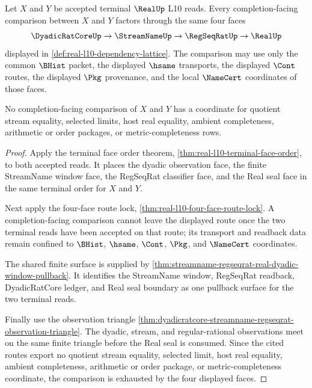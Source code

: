 \begin{theorem}
\label{thm:real-l10-terminal-comparison-exhaustion}
Let $X$ and $Y$ be accepted terminal $\RealUp$ L10 reads. Every
completion-facing comparison between $X$ and $Y$ factors through the same
four faces
$$
\DyadicRatCoreUp \to \StreamNameUp \to \RegSeqRatUp \to \RealUp
$$
displayed in \autoref{def:real-l10-dependency-lattice}. The comparison may
use only the common $\BHist$ packet, the displayed $\hsame$ transports, the
displayed $\Cont$ routes, the displayed $\Pkg$ provenance, and the local
$\NameCert$ coordinates of those faces.

No completion-facing comparison of $X$ and $Y$ has a coordinate for quotient
stream equality, selected limits, host real equality, ambient completeness,
arithmetic or order packages, or metric-completeness rows.
\end{theorem}
\begin{proof}
Apply the terminal face order theorem,
\autoref{thm:real-l10-terminal-face-order}, to both accepted reads. It places
the dyadic observation face, the finite StreamName window face, the RegSeqRat
classifier face, and the Real seal face in the same terminal order for $X$
and $Y$.

Next apply the four-face route lock,
\autoref{thm:real-l10-four-face-route-lock}. A completion-facing comparison
cannot leave the displayed route once the two terminal reads have been
accepted on that route; its transport and readback data remain confined to
$\BHist$, $\hsame$, $\Cont$, $\Pkg$, and $\NameCert$ coordinates.

The shared finite surface is supplied by
\autoref{thm:streamname-regseqrat-real-dyadic-window-pullback}. It identifies
the StreamName window, RegSeqRat readback, DyadicRatCore ledger, and Real
seal boundary as one pullback surface for the two terminal reads.

Finally use the observation triangle
\autoref{thm:dyadicratcore-streamname-regseqrat-observation-triangle}. The
dyadic, stream, and regular-rational observations meet on the same finite
triangle before the Real seal is consumed. Since the cited routes export no
quotient stream equality, selected limit, host real equality, ambient
completeness, arithmetic or order package, or metric-completeness coordinate,
the comparison is exhausted by the four displayed faces.
\end{proof}

